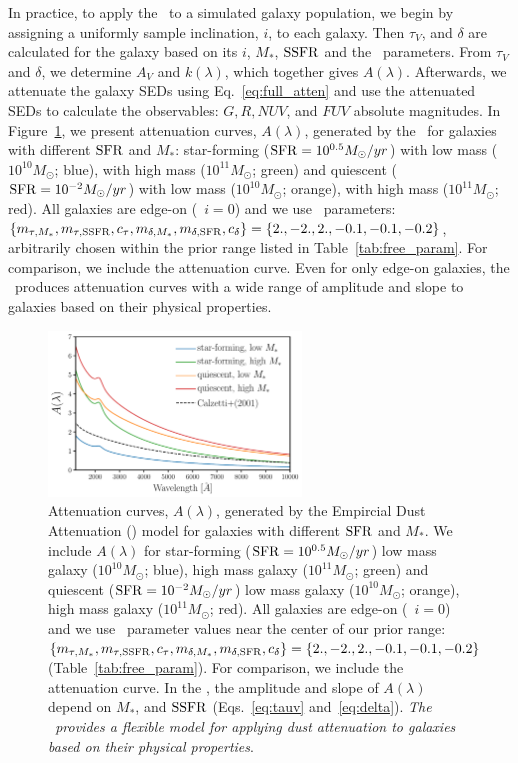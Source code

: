 In practice, to apply the \eda~to a simulated galaxy population, we begin by
assigning a uniformly sample inclination, $i$, to each galaxy. Then $\tau_V$,
and $\delta$ are calculated for the galaxy based on its $i$, $M_*$, ${\rm SSFR}$ and
the \eda~parameters. From $\tau_V$ and $\delta$, we determine $A_V$ and
$k(\lambda)$, which together gives $A(\lambda)$.  Afterwards, we attenuate the
galaxy SEDs using Eq.~\ref{eq:full_atten} and use the attenuated SEDs to
calculate the observables: $G, R, NUV$, and $FUV$
absolute magnitudes. In Figure~\ref{fig:dem_av}, we present attenuation curves,
$A(\lambda)$, generated by the \eda~for galaxies with different ${\rm SFR}$ and $M_*$: 
star-forming (${\rm SFR}=10^{0.5}M_\odot/yr$) with low mass ($10^{10}M_\odot$;
blue), with high mass ($10^{11}M_\odot$; green) and quiescent
(${\rm SFR}=10^{-2}M_\odot/yr$) with low mass ($10^{10}M_\odot$; orange), with high
mass ($10^{11}M_\odot$; red). All galaxies are edge-on (\ie~$i=0$) and we use
\eda~parameters: $\{m_{\tau,M_*}, m_{\tau,{\rm SSFR}}, c_\tau, m_{\delta,M_*}, m_{\delta,{\rm SFR}}, c_\delta\} =
\{2., -2., 2., -0.1, -0.1, -0.2\}$, arbitrarily chosen within the prior range
listed in Table~\ref{tab:free_param}. For comparison, we include the
\cite{calzetti2001} attenuation curve. Even for only edge-on galaxies, the
\eda~produces attenuation curves with a wide range of amplitude and
slope to galaxies based on their physical properties. 

\begin{figure}
\begin{center}
    \includegraphics[width=0.6\textwidth]{figs/dems.pdf}
    \caption{\label{fig:dem_av}
    Attenuation curves, $A(\lambda)$, generated by the Empircial Dust Attenuation (\eda)
    model for galaxies with different ${\rm SFR}$ and $M_*$. We include $A(\lambda)$ for 
    star-forming (${\rm SFR}=10^{0.5}M_\odot/yr$) low mass galaxy ($10^{10}M_\odot$;
    blue), high mass galaxy ($10^{11}M_\odot$; green) and quiescent
    (${\rm SFR}=10^{-2}M_\odot/yr$) low mass galaxy ($10^{10}M_\odot$; orange), 
    high mass galaxy ($10^{11}M_\odot$; red). All galaxies are edge-on
    (\ie~$i=0$) and we use \eda~parameter values near the center of our prior
    range:$\{m_{\tau,M_*}, m_{\tau,{\rm SSFR}}, c_\tau, m_{\delta,M_*}, m_{\delta,{\rm SFR}}, c_\delta\} = \{2.,
    -2., 2., -0.1, -0.1, -0.2\}$ (Table~\ref{tab:free_param}). For comparison,
    we include the \cite{calzetti2001} attenuation curve. In the \eda, the
    amplitude and slope of $A(\lambda)$ depend on $M_*$, and ${\rm SSFR}$ (Eqs.~\ref{eq:tauv}
    and~\ref{eq:delta}). {\em The \eda~provides a flexible model for
    applying dust attenuation to galaxies based on their physical properties}.
    } 
\end{center}
\end{figure}


